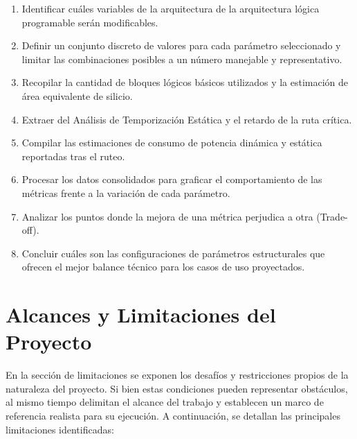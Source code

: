 \begin{enumerate}

    \item Identificar cuáles variables de la arquitectura de la arquitectura lógica 
    programable serán modificables.

    \item Definir un conjunto discreto de valores para cada parámetro seleccionado y 
    limitar las combinaciones posibles a un número manejable y representativo.
    
    \item Recopilar la cantidad de bloques lógicos básicos utilizados y la estimación de 
    área equivalente de silicio.

    \item Extraer del Análisis de Temporización Estática y el retardo de la ruta crítica.

    \item Compilar las estimaciones de consumo de potencia dinámica y estática reportadas 
    tras el ruteo.

    \item Procesar los datos consolidados para graficar el comportamiento de las métricas 
    frente a la variación de cada parámetro.

    \item Analizar los puntos donde la mejora de una métrica perjudica a otra (Trade-off).
    
    \item Concluir cuáles son las configuraciones de parámetros estructurales que ofrecen 
    el mejor balance técnico para los casos de uso proyectados.

\end{enumerate}


\section{Alcances y Limitaciones del Proyecto}

En la sección de limitaciones se exponen los desafíos y restricciones propios de la 
naturaleza del proyecto. Si bien estas condiciones pueden representar obstáculos, 
al mismo tiempo delimitan el alcance del trabajo y establecen un marco de referencia 
realista para su ejecución. A continuación, se detallan las principales limitaciones 
identificadas:

